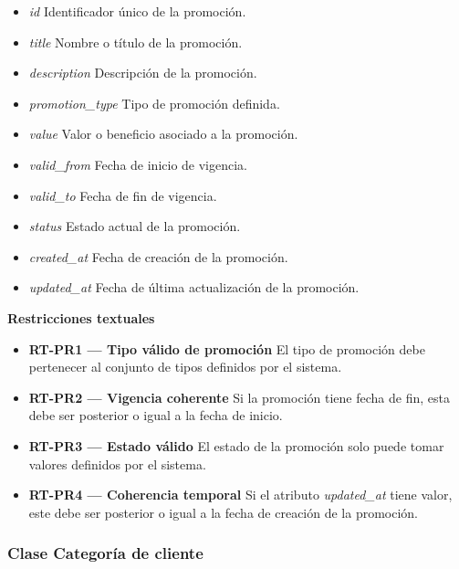 \begin{itemize}

      \item \textit{id}
            Identificador único de la promoción.
      \item \textit{title}
            Nombre o título de la promoción.
      \item \textit{description}
            Descripción de la promoción.
      \item \textit{promotion\_type}
            Tipo de promoción definida.
      \item \textit{value}
            Valor o beneficio asociado a la promoción.
      \item \textit{valid\_from}
            Fecha de inicio de vigencia.
      \item \textit{valid\_to}
            Fecha de fin de vigencia.
      \item \textit{status}
            Estado actual de la promoción.
      \item \textit{created\_at}
            Fecha de creación de la promoción.
      \item \textit{updated\_at}
            Fecha de última actualización de la promoción.

\end{itemize}

\textbf{Restricciones textuales}

\begin{itemize}

      \item \textbf{RT-PR1 — Tipo válido de promoción}
            El tipo de promoción debe pertenecer al conjunto de tipos definidos por el sistema.
      \item \textbf{RT-PR2 — Vigencia coherente}
            Si la promoción tiene fecha de fin, esta debe ser posterior o igual a la fecha de inicio.
      \item \textbf{RT-PR3 — Estado válido}
            El estado de la promoción solo puede tomar valores definidos por el sistema.
      \item \textbf{RT-PR4 — Coherencia temporal}
            Si el atributo \textit{updated\_at} tiene valor, este debe ser posterior o igual a la fecha de creación de la promoción.

\end{itemize}

\subsubsection{Clase Categoría de cliente}

